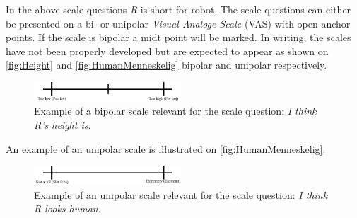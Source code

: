 %
In the above scale questions \textit{R} is short for robot. The scale questions can either be presented on a bi- or unipolar \textit{Visual Analoge Scale} (VAS) with open anchor points. If the scale is bipolar a midt point will be marked. In writing, the scales have not been properly developed but are expected to appear as shown on \autoref{fig:Height} and \autoref{fig:HumanMenneskelig} bipolar and unipolar respectively.
%
\begin{figure}[H]
\centering
\includegraphics[width = 0.49\textwidth]{Figure/HeightHoejde} 
\caption{Example of a bipolar scale relevant for the scale question: \textit{I think R's height is}.}
\label{fig:Height}
\end{figure}
\noindent
% 
An example of an unipolar scale is illustrated on \autoref{fig:HumanMenneskelig}.
%
\begin{figure}[H]
\centering
\includegraphics[width = 0.49\textwidth]{Figure/HumanMenneskelig} 
\caption{Example of an unipolar scale relevant for the scale question: \textit{I think R looks human}.}
\label{fig:HumanMenneskelig}
\end{figure}
\noindent
